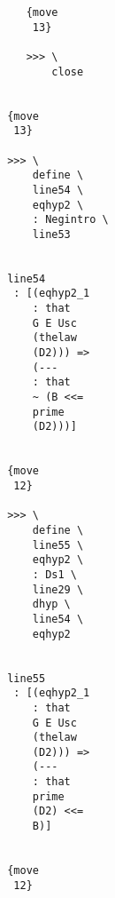 \documentclass[12pt]{article}
\begin{document}
\begin{verbatim}
                                          {move 
                                           13}

                                          >>> \
                                              close


                                       {move 
                                        13}

                                       >>> \
                                           define \
                                           line54 \
                                           eqhyp2 \
                                           : Negintro \
                                           line53


                                       line54 
                                        : [(eqhyp2_1 
                                           : that 
                                           G E Usc 
                                           (thelaw 
                                           (D2))) => 
                                           (--- 
                                           : that 
                                           ~ (B <<= 
                                           prime 
                                           (D2)))]


                                       {move 
                                        12}

                                       >>> \
                                           define \
                                           line55 \
                                           eqhyp2 \
                                           : Ds1 \
                                           line29 \
                                           dhyp \
                                           line54 \
                                           eqhyp2


                                       line55 
                                        : [(eqhyp2_1 
                                           : that 
                                           G E Usc 
                                           (thelaw 
                                           (D2))) => 
                                           (--- 
                                           : that 
                                           prime 
                                           (D2) <<= 
                                           B)]


                                       {move 
                                        12}


\end{verbatim}
\end{document}
